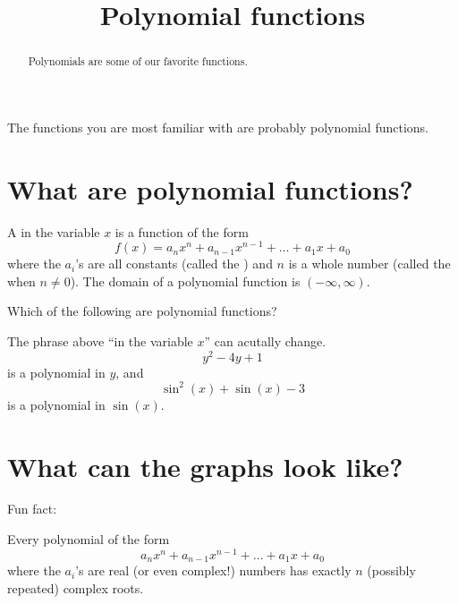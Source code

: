 \documentclass{ximera}
\title[Dig-In:]{Polynomial functions}
\begin{document}
\begin{abstract}
  Polynomials are some of our favorite functions. 
\end{abstract}
\maketitle


The functions you are most familiar with are probably polynomial
functions.

\section{What are polynomial functions?}

\begin{definition}
  A  in the variable $x$ is a function
  of the form
  \[
  f(x) = a_nx^n + a_{n-1}x^{n-1} + \dots + a_1 x + a_0
  \]
  where the $a_i$'s are all constants (called the )
  and $n$ is a whole number (called the  when $n\ne
  0$). The domain of a polynomial function is $(-\infty,\infty)$.
\end{definition}

\begin{question}
  Which of the following are polynomial functions?
  \begin{multipleChoice}
  \end{multipleChoice}
\end{question}

The phrase above ``in the variable $x$'' can acutally change.
\[
y^2-4y +1
\]
is a polynomial in $y$, and
\[
\sin^2(x) + \sin(x) -3 
\]
is a polynomial in $\sin(x)$.


\section{What can the graphs look like?}

Fun fact:

\begin{theorem}
  Every polynomial of the form
  \[
  a_n x^n + a_{n-1} x^{n-1} + \dots + a_1 x + a_0
  \]
  where the $a_i$'s are real (or even complex!) numbers has exactly
  $n$ (possibly repeated) complex roots.
\end{theorem}
\end{document}
